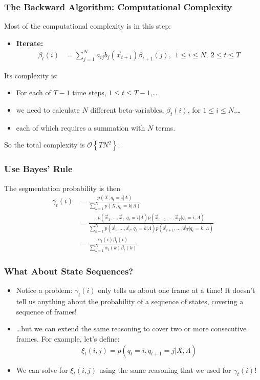 \documentclass{beamer}
\begin{document}
  
\begin{frame}
  \frametitle{The Backward Algorithm: Computational Complexity}

  Most of the computational complexity is in this step:
  \begin{itemize}
  \item {\bf Iterate:}
    \begin{align*}
      \beta_{t}(i) 
      &= \sum_{j=1}^N a_{ij}b_j(\vec{x}_{t+1})\beta_{t+1}(j),~~1\le i\le N,~2\le t\le T
    \end{align*}
  \end{itemize}
  Its complexity is:
  \begin{itemize}
  \item For each of $T-1$ time steps, $1\le t\le T-1$,\ldots
  \item we need to calculate $N$ different beta-variables, $\beta_t(i)$, for $1\le i\le N$,\ldots
  \item each of which requires a summation with $N$ terms.
  \end{itemize}
  So the total complexity is ${\mathcal O}\left\{TN^2\right\}$.
\end{frame}

\begin{frame}
  \frametitle{Use Bayes' Rule}

  The segmentation probability is then
  \begin{align*}
    \gamma_t(i) &= \frac{p(X,q_t=i|\Lambda)}{\sum_{k=1}^N p(X,q_t=k|\Lambda)}\\
    &= \frac{p(\vec{x}_1,\ldots,\vec{x}_t,q_t=i|\Lambda)p(\vec{x}_{t+1},\ldots,\vec{x}_T|q_t=i,\Lambda)}{\sum_{k=1}^N p(\vec{x}_1,\ldots,\vec{x}_t,q_t=k|\Lambda)p(\vec{x}_{t+1},\ldots,\vec{x}_T|q_t=k,\Lambda)}\\
    &= \frac{\alpha_t(i)\beta_t(i)}{\sum_{k=1}^N\alpha_t(k)\beta_t(k)}
  \end{align*}
\end{frame}

\begin{frame}
  \frametitle{What About State Sequences?}

  \begin{itemize}
  \item Notice a problem: $\gamma_t(i)$ only tells us about one frame at a time!  It doesn't tell
    us anything about the probability of a sequence of states, covering a sequence of frames!
  \item \ldots but we can extend the same reasoning to cover two or
    more consecutive frames.  For example, let's define:
    \[
    \xi_t(i,j) = p(q_t=i,q_{t+1}=j|X,\Lambda)
    \]
    \item We can solve for $\xi_t(i,j)$ using the same reasoning that
      we used for $\gamma_t(i)$!
  \end{itemize}
\end{frame}
\end{document}
